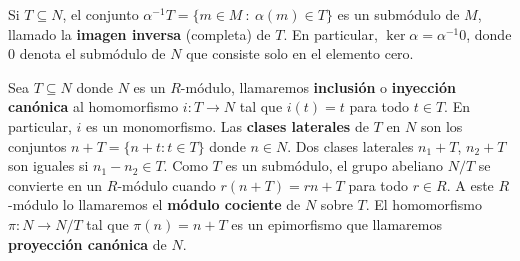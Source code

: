 Si \(T \subseteq N\), el conjunto \(\alpha^{-1}T = \{ m \in M \ : \ \alpha(m) \in T
\}\) es un submódulo de \(M\), llamado la \textbf{imagen inversa} (completa) de \(T\).
En particular, \(\ker \alpha = \alpha^{-1}0\), donde \(0\) denota el submódulo de
\(N\) que consiste solo en el elemento cero.

Sea \(T \subseteq N\) donde \(N\) es un \(R\)-módulo, llamaremos \textbf{inclusión} o
\textbf{inyección canónica} al homomorfismo \(i: T \rightarrow N\) tal que \(i(t) =
t\) para todo \(t \in T\). En particular, \(i\) es un monomorfismo. Las \textbf{clases
	laterales} de \(T\) en \(N\) son los conjuntos \(n + T = \{n + t : t \in T\}\) donde \(n
\in N\). Dos clases laterales \(n_{1}+ T\), \(n_{2}+ T\) son iguales si \(n_{1}- n_{2}\in
T\). Como \(T\) es un submódulo, el grupo abeliano \(N/T\) se convierte en un \(R\)-módulo
cuando \(r(n+T) = rn + T\) para todo \(r \in R\). A este \(R\)-módulo lo llamaremos el
\textbf{módulo cociente} de \(N\) sobre \(T\). El homomorfismo
\(\pi: N \rightarrow N/ T\) tal que \(\pi(n) = n + T\) es un epimorfismo que
llamaremos \textbf{proyección canónica} de \(N\).

